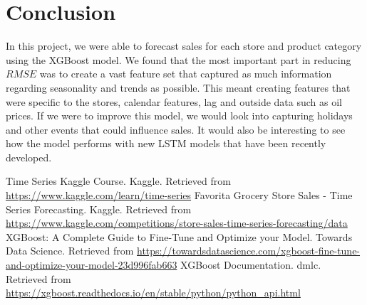 \documentclass[12pt]{article}
\begin{document}
\section{Conclusion}
In this project, we were able to forecast sales for each store and product category using the XGBoost model.
We found that the most important part in reducing $RMSE$ was to create a vast feature set that captured as much information regarding seasonality and trends as possible.
This meant creating features that were specific to the stores, calendar features, lag and outside data such as oil prices.
If we were to improve this model, we would look into capturing holidays and other events that could influence sales.
It would also be interesting to see how the model performs with new LSTM models that have been recently developed.
\begin{thebibliography}{9}
Time Series Kaggle Course. Kaggle. Retrieved from \url{https://www.kaggle.com/learn/time-series}
Favorita Grocery Store Sales - Time Series Forecasting. Kaggle. Retrieved from \url{https://www.kaggle.com/competitions/store-sales-time-series-forecasting/data}
XGBoost: A Complete Guide to Fine-Tune and Optimize your Model. Towards Data Science. Retrieved from \url{https://towardsdatascience.com/xgboost-fine-tune-and-optimize-your-model-23d996fab663}
XGBoost Documentation. dmlc. Retrieved from \url{https://xgboost.readthedocs.io/en/stable/python/python_api.html}

\end{thebibliography}
\end{document}
